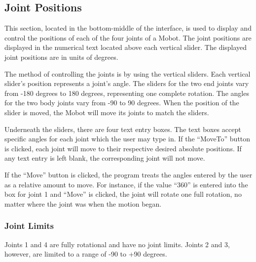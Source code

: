 \documentclass{article}
\begin{document}
\subsection{Joint Positions}
This section, located in the bottom-middle of the interface, is used to display
and control the positions of each of the four
joints of a Mobot. The joint positions are displayed in the numerical
text located above each vertical slider. The displayed joint positions are in
units of degrees.  

The method of controlling the joints is by using the vertical sliders.
Each vertical slider's position represents a joint's angle. The sliders for the
two end joints vary from -180 degrees to 180 degrees, representing one complete
rotation. The angles for the two body joints vary from -90 to 90 degrees. When
the position of the slider is moved, the Mobot will move its joints to match the 
sliders. 

Underneath the sliders, there are four text entry boxes. The text boxes
accept specific angles for each joint which the user may type in. If 
the ``MoveTo'' button is clicked, each joint will move to their respective 
desired absolute positions. If any text entry is left blank, the corresponding joint will
not move. 

If the ``Move'' button is clicked, the program treats the angles entered by the
user as a relative amount to move. For instance, if the value ``360'' is entered
into the box for joint 1 and ``Move'' is clicked, the joint will rotate one full
rotation, no matter where the joint was when the motion began.

\subsubsection{Joint Limits}
Joints 1 and 4 are fully rotational and have no joint limits. Joints 2 and 3, however, are 
limited to a range of -90 to +90 degrees.
\end{document}

